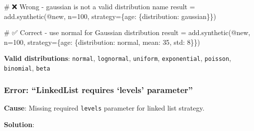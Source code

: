 \documentclass[
  letterpaper,
]{scrbook}
\newenvironment{Shaded}{\begin{snugshade}}{\end{snugshade}}
\newcommand{\CommentTok}[1]{\textcolor[rgb]{0.37,0.37,0.37}{#1}}
\newcommand{\DecValTok}[1]{\textcolor[rgb]{0.68,0.00,0.00}{#1}}
\newcommand{\NormalTok}[1]{\textcolor[rgb]{0.00,0.23,0.31}{#1}}
\newcommand{\OperatorTok}[1]{\textcolor[rgb]{0.37,0.37,0.37}{#1}}
\newcommand{\StringTok}[1]{\textcolor[rgb]{0.13,0.47,0.30}{#1}}
\begin{document}
\begin{Shaded}
\begin{Highlighting}[]
\CommentTok{\# ❌ Wrong {-} \textquotesingle{}gaussian\textquotesingle{} is not a valid distribution name}
\NormalTok{result }\OperatorTok{=}\NormalTok{ add.synthetic(}\StringTok{\textquotesingle{}@new\textquotesingle{}}\NormalTok{, n}\OperatorTok{=}\DecValTok{100}\NormalTok{, }
\NormalTok{                       strategy}\OperatorTok{=}\NormalTok{\{}\StringTok{\textquotesingle{}age\textquotesingle{}}\NormalTok{: \{}\StringTok{\textquotesingle{}distribution\textquotesingle{}}\NormalTok{: }\StringTok{\textquotesingle{}gaussian\textquotesingle{}}\NormalTok{\}\})}

\CommentTok{\# ✅ Correct {-} use \textquotesingle{}normal\textquotesingle{} for Gaussian distribution}
\NormalTok{result }\OperatorTok{=}\NormalTok{ add.synthetic(}\StringTok{\textquotesingle{}@new\textquotesingle{}}\NormalTok{, n}\OperatorTok{=}\DecValTok{100}\NormalTok{, }
\NormalTok{                       strategy}\OperatorTok{=}\NormalTok{\{}\StringTok{\textquotesingle{}age\textquotesingle{}}\NormalTok{: \{}\StringTok{\textquotesingle{}distribution\textquotesingle{}}\NormalTok{: }\StringTok{\textquotesingle{}normal\textquotesingle{}}\NormalTok{, }\StringTok{\textquotesingle{}mean\textquotesingle{}}\NormalTok{: }\DecValTok{35}\NormalTok{, }\StringTok{\textquotesingle{}std\textquotesingle{}}\NormalTok{: }\DecValTok{8}\NormalTok{\}\})}
\end{Highlighting}
\end{Shaded}

\textbf{Valid distributions}: \texttt{normal}, \texttt{lognormal},
\texttt{uniform}, \texttt{exponential}, \texttt{poisson},
\texttt{binomial}, \texttt{beta}

\subsubsection{Error: ``LinkedList requires `levels'
parameter''}\label{error-linkedlist-requires-levels-parameter}

\textbf{Cause}: Missing required \texttt{levels} parameter for linked
list strategy.

\textbf{Solution}:
\end{document}
